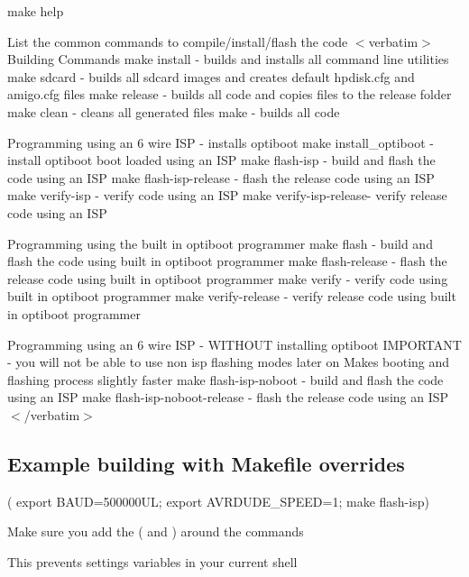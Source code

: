 \begin{DoxyItemize}
\item make help
\begin{DoxyItemize}
\item List the common commands to compile/install/flash the code $<$verbatim$>$ Building Commands make install -\/ builds and installs all command line utilities make sdcard -\/ builds all sdcard images and creates default hpdisk.\+cfg and amigo.\+cfg files make release -\/ builds all code and copies files to the release folder make clean -\/ cleans all generated files make -\/ builds all code

Programming using an 6 wire I\+SP -\/ installs optiboot make install\+\_\+optiboot -\/ install optiboot boot loaded using an I\+SP make flash-\/isp -\/ build and flash the code using an I\+SP make flash-\/isp-\/release -\/ flash the release code using an I\+SP make verify-\/isp -\/ verify code using an I\+SP make verify-\/isp-\/release-\/ verify release code using an I\+SP

Programming using the built in optiboot programmer make flash -\/ build and flash the code using built in optiboot programmer make flash-\/release -\/ flash the release code using built in optiboot programmer make verify -\/ verify code using built in optiboot programmer make verify-\/release -\/ verify release code using built in optiboot programmer

Programming using an 6 wire I\+SP -\/ W\+I\+T\+H\+O\+UT installing optiboot I\+M\+P\+O\+R\+T\+A\+NT -\/ you will not be able to use non isp flashing modes later on Makes booting and flashing process slightly faster make flash-\/isp-\/noboot -\/ build and flash the code using an I\+SP make flash-\/isp-\/noboot-\/release -\/ flash the release code using an I\+SP $<$/verbatim$>$
\end{DoxyItemize}
\end{DoxyItemize}

\subsection*{Example building with Makefile overrides}


\begin{DoxyItemize}
\item ( export B\+A\+UD=500000\+UL; export A\+V\+R\+D\+U\+D\+E\+\_\+\+S\+P\+E\+ED=1; make flash-\/isp)
\begin{DoxyItemize}
\item Make sure you add the \textquotesingle{}(\textquotesingle{} and \textquotesingle{})\textquotesingle{} around the commands
\begin{DoxyItemize}
\item This prevents settings variables in your current shell 


\end{DoxyItemize}
\end{DoxyItemize}
\end{DoxyItemize}

